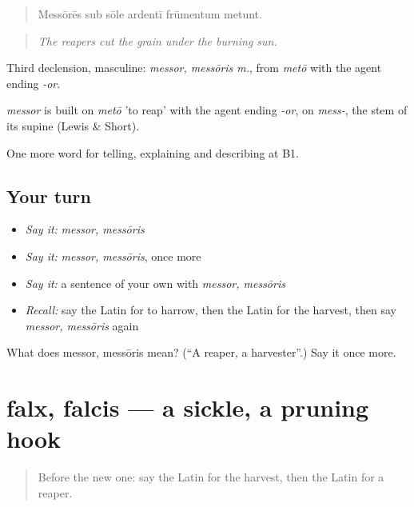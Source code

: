\begin{quote}
Messōrēs sub sōle ardentī frūmentum metunt.
\end{quote}

\begin{quote}
\emph{The reapers cut the grain under the burning sun.}
\end{quote}

Third declension, masculine: \emph{messor, messōris m.}, from \emph{metō} with the agent ending \emph{-or}.

\begin{cousinweb}
\emph{messor} is built on \emph{metō} 'to reap' with the agent ending \emph{-or}, on \emph{mess-}, the stem of its supine (Lewis \& Short).
\end{cousinweb}

\begin{grammarlens}[title={What you've built}]
One more word for telling, explaining and describing at B1.
\end{grammarlens}

\subsection*{Your turn}
\begin{itemize}
\raggedright
  \item \emph{Say it:} \emph{messor, messōris}
  \item \emph{Say it:} \emph{messor, messōris}, once more
  \item \emph{Say it:} a sentence of your own with \emph{messor, messōris}
  \item \emph{Recall:} say the Latin for to harrow, then the Latin for the harvest, then say \emph{messor, messōris} again
\end{itemize}

\begin{tcolorbox}[breakable,colback=teal!4,colframe=teal!35!black,title={Before you move on}]
What does messor, messōris mean? (\textquotedblleft{}A reaper, a harvester\textquotedblright{}.) Say it once more.
\end{tcolorbox}
\section[falx, falcis]{falx, falcis — a sickle, a pruning hook}

\label{lesson:LA-C475-falx}



\begin{quote}
Before the new one: say the Latin for the harvest, then the Latin for a reaper.
\end{quote}

